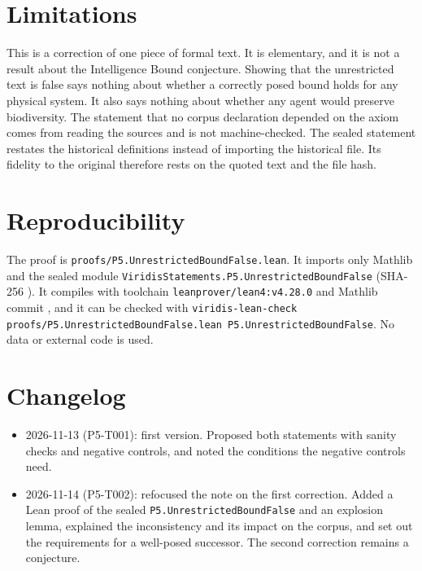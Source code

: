 \documentclass[11pt]{article}
\theoremstyle{remark}
\begin{document}
\section{Limitations}
This is a correction of one piece of formal text. It is elementary, and it is not a result about
the Intelligence Bound conjecture. Showing that the unrestricted text is false says nothing about
whether a correctly posed bound holds for any physical system. It also says nothing about
whether any agent would preserve biodiversity. The statement that no corpus declaration depended
on the axiom comes from reading the sources and is not machine-checked. The sealed statement
restates the historical definitions instead of importing the historical file. Its fidelity to the
original therefore rests on the quoted text and the file hash.

\section{Reproducibility}
The proof is \texttt{proofs/P5.UnrestrictedBoundFalse.lean}. It imports only Mathlib and the
sealed module \texttt{ViridisStatements.P5.UnrestrictedBoundFalse} (SHA-256
). It compiles with
toolchain \texttt{leanprover/lean4:v4.28.0} and Mathlib commit
, and it can be checked with
\texttt{viridis-lean-check proofs/P5.UnrestrictedBoundFalse.lean P5.UnrestrictedBoundFalse}.
No data or external code is used.

\section{Changelog}
\begin{itemize}
\item 2026-11-13 (P5-T001): first version. Proposed both statements with sanity checks and
negative controls, and noted the conditions the negative controls need.
\item 2026-11-14 (P5-T002): refocused the note on the first correction. Added a Lean proof of
the sealed \texttt{P5.UnrestrictedBoundFalse} and an explosion lemma, explained the
inconsistency and its impact on the corpus, and set out the requirements for a well-posed
successor. The second correction remains a conjecture.
\end{itemize}



\end{document}
